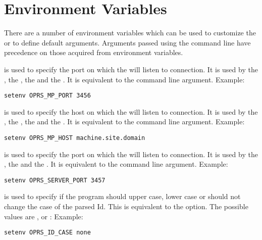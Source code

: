 \section{\OPRSS{} Environment Variables}

There are a number of environment variables which can be used to customize the
\OPRSS{} or to define default arguments. Arguments passed using the command line
have precedence on those acquired from environment variables.

\begin{description}

\item[\code{OPRS\_MP\_PORT}] is used  to specify the port on which the \MP{} will
listen to connection. It is used by the \CPK{}, the \XPK{}, the \OPRSS{}
and the \MP{}. It is equivalent to the  command line argument.\*
Example:
\begin{verbatim}
setenv OPRS_MP_PORT 3456
\end{verbatim}

\item[\code{OPRS\_MP\_HOST}] is used  to specify the host on which the \MP{} will
listen to connection. It is used by the \CPK{}, the \XPK{}, the \MP{} and the
\OPRSS{}.  It is equivalent to the  command line argument.\*
Example:
\begin{verbatim}
setenv OPRS_MP_HOST machine.site.domain
\end{verbatim}

\item[\code{OPRS\_SERVER\_PORT}] is used  to specify the port on which the
\OPRSS{} will listen to connection. It is used by the \CPK{}, the \XPK{}
and the \OPRSS{}.  It is equivalent to the  command line argument.\*
Example:
\begin{verbatim}
setenv OPRS_SERVER_PORT 3457
\end{verbatim}

\item[\code{OPRS\_ID\_CASE}] is used to specify if the program should upper case,
lower case or should not change the case of the parsed Id. This is equivalent
to the  option. The possible values
are ,  or :\*
Example:
\begin{verbatim}
setenv OPRS_ID_CASE none
\end{verbatim}

\end{description}


